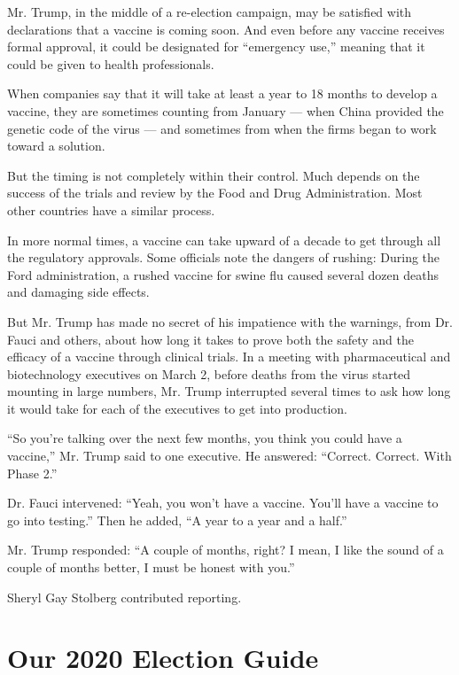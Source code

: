 Mr. Trump, in the middle of a re-election campaign, may be satisfied
with declarations that a vaccine is coming soon. And even before any
vaccine receives formal approval, it could be designated for ``emergency
use,'' meaning that it could be given to health professionals.

When companies say that it will take at least a year to 18 months to
develop a vaccine, they are sometimes counting from January --- when
China provided the genetic code of the virus --- and sometimes from when
the firms began to work toward a solution.

But the timing is not completely within their control. Much depends on
the success of the trials and review by the Food and Drug
Administration. Most other countries have a similar process.

In more normal times, a vaccine can take upward of a decade to get
through all the regulatory approvals. Some officials note the dangers of
rushing: During the Ford administration, a rushed vaccine for swine flu
caused several dozen deaths and damaging side effects.

But Mr. Trump has made no secret of his impatience with the warnings,
from Dr. Fauci and others, about how long it takes to prove both the
safety and the efficacy of a vaccine through clinical trials. In a
meeting with pharmaceutical and biotechnology executives on March 2,
before deaths from the virus started mounting in large numbers, Mr.
Trump interrupted several times to ask how long it would take for each
of the executives to get into production.

``So you're talking over the next few months, you think you could have a
vaccine,'' Mr. Trump said to one executive. He answered: ``Correct.
Correct. With Phase 2.''

Dr. Fauci intervened: ``Yeah, you won't have a vaccine. You'll have a
vaccine to go into testing.'' Then he added, ``A year to a year and a
half.''

Mr. Trump responded: ``A couple of months, right? I mean, I like the
sound of a couple of months better, I must be honest with you.''

Sheryl Gay Stolberg contributed reporting.

\hypertarget{our-2020-election-guide}{%
\section{Our 2020 Election Guide}\label{our-2020-election-guide}}

